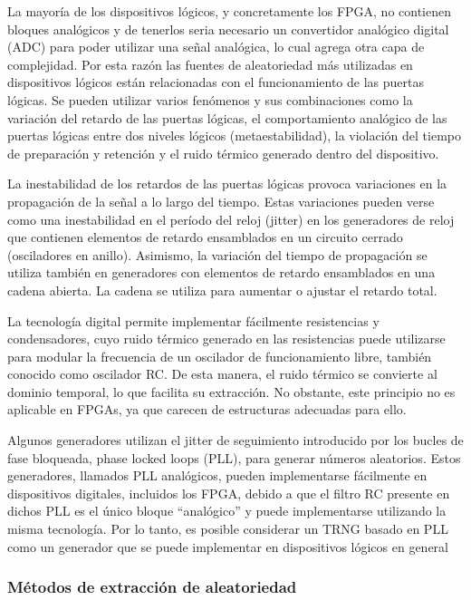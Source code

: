             La mayoría de los dispositivos lógicos, y concretamente los FPGA, no contienen bloques analógicos y de tenerlos seria necesario un convertidor analógico digital (ADC) para poder utilizar una señal analógica, lo cual agrega otra capa de complejidad. Por esta razón las fuentes de aleatoriedad más utilizadas en dispositivos lógicos están relacionadas con el funcionamiento de las puertas lógicas. Se pueden utilizar varios fenómenos y sus combinaciones como la variación del retardo de las puertas lógicas, el comportamiento analógico de las puertas lógicas entre dos niveles lógicos (metaestabilidad), la violación del tiempo de preparación y retención y el ruido térmico generado dentro del dispositivo.	
					
	        La inestabilidad de los retardos de las puertas lógicas provoca variaciones en la propagación de la señal a lo largo del tiempo. Estas variaciones pueden verse como una inestabilidad  en el período del reloj (jitter) en los generadores de reloj que contienen elementos de retardo ensamblados en un circuito cerrado (osciladores en anillo). Asimismo, la variación del tiempo de propagación se utiliza también en generadores con elementos de retardo ensamblados en una cadena abierta. La cadena se utiliza para aumentar o ajustar el retardo total.

            La tecnología digital permite implementar fácilmente resistencias y condensadores, cuyo ruido térmico generado en las resistencias puede utilizarse para modular la frecuencia de un oscilador de funcionamiento libre, también conocido como oscilador RC. De esta manera, el ruido térmico se convierte al dominio temporal, lo que facilita su extracción. No obstante, este principio no es aplicable en FPGAs, ya que carecen de estructuras adecuadas para ello.

            Algunos generadores utilizan el jitter de seguimiento introducido por los bucles de fase bloqueada, phase locked loops (PLL), para generar números aleatorios. Estos generadores, llamados PLL analógicos, pueden implementarse fácilmente en dispositivos digitales, incluidos los FPGA, debido a que el filtro RC presente en dichos PLL es el único bloque ``analógico'' y puede implementarse utilizando la misma tecnología. Por lo tanto, es posible considerar un TRNG basado en PLL como un generador que se puede implementar en dispositivos lógicos en general
					
            \subsubsection{Métodos de extracción de aleatoriedad}	

